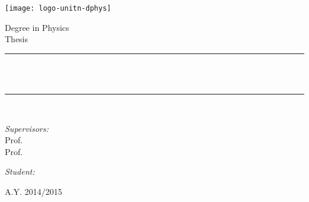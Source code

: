 
\graphicspath{{Frontmatter/figures/PNG/}{Frontmatter/figures/PDF/}{Frontmatter/figures/}}

\begin{titlepage}
	
	\begin{center}
	
		\texttt{[image: logo-unitn-dphys]}\\[0.4cm]
		
		\vskip 5.5cm
		
		{\Large Degree in Physics}\\[0.5cm]
		
		{\Large Thesis}\\[0.5cm]
		
		\rule{\linewidth}{0.2mm} \\[0.5cm]
		
		{ \huge \bfseries \THtitle \\[0.5cm] }
		
		\rule{\linewidth}{0.2mm} \\[2cm]
		
		\begin{minipage}[t]{0.45\textwidth}
			\begin{flushleft} \large
				\emph{Supervisors:} \\[0.25cm]
				Prof. \THsupervisor \\[0.10cm]
				Prof. \THextrasupervisor
			\end{flushleft}
		\end{minipage}
		\begin{minipage}[t]{0.45\textwidth}
			\begin{flushright} \large
				\emph{Student:}\\[0.25cm]
				{ \THauthor }
			\end{flushright}
		\end{minipage}
		
		\vfill
		
		{\large A.Y. 2014/2015}
		
	\end{center}
	
	\restoregeometry
\end{titlepage}